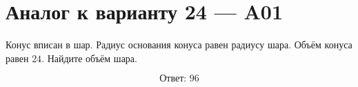\documentclass[12pt,a4paper]{article}
\begin{document}
\section*{Аналог к варианту 24 — A01}

Конус вписан в шар. Радиус основания конуса равен радиусу шара. Объём конуса равен \(24\). Найдите объём шара.

\begin{center}
\end{center}

\[
\boxed{\text{Ответ: }96}
\]
\end{document}
